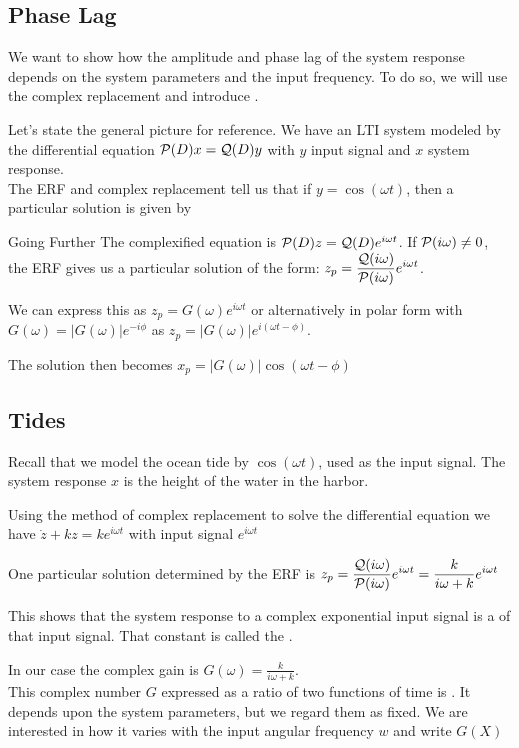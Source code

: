 \documentclass[11pt, openright]{book}
\begin{document}
\subsection{Phase Lag}

We want to show how the amplitude and phase lag of the system response depends on the system parameters and the input frequency. To do so, we will use the complex replacement and introduce .

Let's state the general picture for reference. We have an LTI system modeled by the differential equation $\P(D)x=\mathcal{Q}(D)y$ with $y$ input signal and $x$ system response.\\
The ERF and complex replacement tell us that if $y=\cos(\omega t)$, then a particular solution is given by

\newpage

\begin{dent}{Going Further}
    The complexified equation is $\P(D)z=\Q(D)e^{i\omega t}$. If $\P(i\omega)\neq0$, the ERF gives us a particular solution of the form: $\ds{z_p=\frac{\Q(i\omega)}{\P(i\omega)}e^{i\omega t}}$.

    We can express this as $z_p=G(\omega)e^{i\omega t}$ or alternatively in polar form with $G(\omega)=|G(\omega)|e^{-i\phi}$ as $z_p=|G(\omega)|e^{i(\omega t-\phi)}$.

    The solution then becomes $x_p=|G(\omega)|\cos(\omega t-\phi)$

\end{dent}

\subsection{Tides}

Recall that we model the ocean tide by $\cos(\omega t)$, used as the input signal. The system response $x$ is the height of the water in the harbor.

Using the method of complex replacement to solve the differential equation we have $\dot{z}+kz=ke^{i\omega t}$ with input signal $e^{i\omega t}$

One particular solution determined by the ERF is $\ds{z_p=\frac{\Q(i\omega)}{\P(i\omega)}e^{i\omega t}=\frac{k}{i\omega + k}e^{i\omega t}}$

This shows that the system response to a complex exponential input signal is a  of that input signal. That constant is called the .

In our case the complex gain is $G(\omega)=\frac{k}{i\omega + k}$.\\
This complex number $G$ expressed as a ratio of two functions of time is . It depends upon the system parameters, but we regard them as fixed. We are interested in how it varies with the input angular frequency $w$ and write $G(X)$
\end{document}
